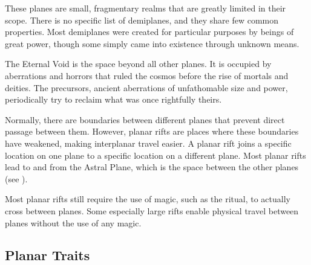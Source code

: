      These planes are small, fragmentary realms that are greatly limited in their scope.
    There is no specific list of demiplanes, and they share few common properties.
    Most demiplanes were created for particular purposes by beings of great power, though some simply came into existence through unknown means.

     The Eternal Void is the space beyond all other planes.
    It is occupied by aberrations and horrors that ruled the cosmos before the rise of mortals and deities.
    The precursors, ancient aberrations of unfathomable size and power, periodically try to reclaim what was once rightfully theirs.

    Normally, there are boundaries between different planes that prevent direct passage between them.
    However, planar rifts are places where these boundaries have weakened, making interplanar travel easier.
    A planar rift joins a specific location on one plane to a specific location on a different plane.
    Most planar rifts lead to and from the Astral Plane, which is the space between the other planes (see ).

    Most planar rifts still require the use of magic, such as the  ritual, to actually cross between planes.
    Some especially large rifts enable physical travel between planes without the use of any magic.

  \subsection{Planar Traits}
